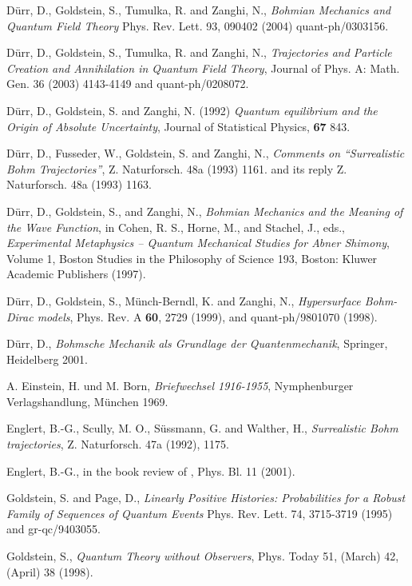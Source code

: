 \begin{thebibliography}{10}
 D\"urr, D., Goldstein, S., Tumulka, R. and Zanghi, N., {\em Bohmian Mechanics and Quantum Field Theory} Phys. Rev. Lett. 93, 
  090402 (2004) quant-ph/0303156. 

 D\"urr, D., Goldstein, S., Tumulka, R. and Zanghi, N., {\em Trajectories and Particle Creation and Annihilation in Quantum 
  Field Theory}, Journal of Phys. A: Math. Gen. 36 (2003) 4143-4149 and  quant-ph/0208072.

 D\"urr, D., Goldstein, S. and Zanghi, N. (1992)
  {\em Quantum equilibrium and the Origin of Absolute Uncertainty}, Journal of 
  Statistical Physics, {\bf 67} 843.

 D\"urr, D., Fusseder, W.,  Goldstein, S. and Zanghi, N., {\em
  Comments on ``Surrealistic Bohm Trajectories''}, Z. Naturforsch. 48a (1993) 
  1161. and its reply Z. Naturforsch. 48a (1993) 1163.

 D\"urr, D., Goldstein, S., and Zanghi, N., {\em Bohmian Mechanics and the Meaning of the Wave Function},
  in Cohen, R. S., Horne, M., and Stachel, J., eds., {\em Experimental Metaphysics -- Quantum Mechanical Studies for 
  Abner Shimony}, Volume 1, Boston Studies in the Philosophy of Science 193, Boston: Kluwer Academic Publishers (1997).


 D\"urr, D., Goldstein, S., M\"unch-Berndl, K. and Zanghi, N., {\em Hypersurface Bohm-Dirac models}, 
Phys. Rev. A {\bf 60}, 2729 (1999), and quant-ph/9801070 (1998). 

  D\"urr, D., {\em Bohmsche Mechanik als Grundlage der Quantenmechanik}, Springer, Heidelberg 2001.

 A. Einstein, H. und M. Born, 
  {\em Briefwechsel 1916-1955}, Nymphenburger Verlagshandlung, M\"unchen 1969. 

 Englert, B.-G.,  Scully, M. O., S\"ussmann, G.  and Walther, H., {\em Surrealistic Bohm trajectories}, 
  Z. Naturforsch. 47a (1992), 1175. 

  Englert, B.-G., in the book review of \cite{buch}, Phys. Bl. 11 (2001).


 Goldstein, S. and Page, D., {\em  Linearly Positive Histories: Probabilities for a Robust Family of Sequences of Quantum Events}
  Phys. Rev. Lett. 74, 3715-3719 (1995) and gr-qc/9403055.

 Goldstein, S., {\em Quantum Theory without Observers}, Phys. Today 51, (March) 42, (April) 38 (1998).


\end{thebibliography}
